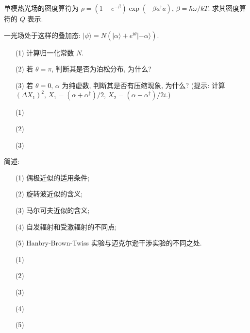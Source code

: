\documentclass{assignment}
\begin{document}
\begin{prob}
    单模热光场的密度算符为 $\rho=(1-e^{-\beta})\exp(-\beta a^{\dagger}a)$, $\beta=\hbar\omega/kT$. 求其密度算符的 $Q$ 表示.
\end{prob}
\begin{sol}

\end{sol}

\begin{prob}
    一光场处于这样的叠加态: $\lvert\psi\rangle=N(\lvert\alpha\rangle+e^{i\theta}\lvert-\alpha\rangle)$.
    \begin{itemize}
        \item[(1)] 计算归一化常数 $N$.
        \item[(2)] 若 $\theta=\pi$, 判断其是否为泊松分布, 为什么?
        \item[(3)] 若 $\theta=0$, $\alpha$ 为纯虚数, 判断其是否有压缩现象, 为什么? (提示: 计算 $(\Delta X_1)^2$, $X_1=(\alpha+\alpha^{\dagger})/2$, $X_2=(\alpha-\alpha^{\dagger})/2i$.)
    \end{itemize}
\end{prob}
\begin{sol}
    \begin{itemize}
        \item[(1)] 
        \item[(2)] 
        \item[(3)] 
    \end{itemize}
\end{sol}

\begin{prob}
    简述:
    \begin{itemize}
        \item[(1)] 偶极近似的适用条件;
        \item[(2)] 旋转波近似的含义;
        \item[(3)] 马尔可夫近似的含义;
        \item[(4)] 自发辐射和受激辐射的不同点;
        \item[(5)] Hanbry-Brown-Twiss 实验与迈克尔逊干涉实验的不同之处.
    \end{itemize}
\end{prob}
\begin{sol}
    \begin{itemize}
        \item[(1)] 
        \item[(2)] 
        \item[(3)] 
        \item[(4)] 
        \item[(5)] 
    \end{itemize}
\end{sol}
\end{document}
